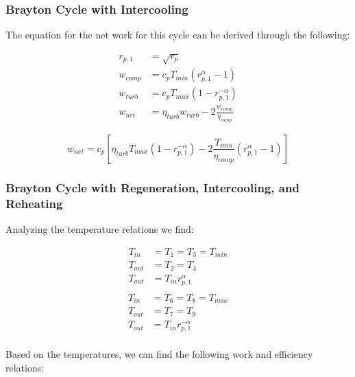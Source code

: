 \documentclass[
	12pt, %
]{brayton_cycle_report_style}
\begin{document}
\subsubsection{Brayton Cycle with Intercooling} 
The equation for the net work for this cycle can be derived through the following:

\begin{align*}
    r_{p,1} &= \sqrt{r_{p}} \\ 
    w_{comp} &= c_p T_{min}(r_{p,1}^\alpha-1) \\
    w_{turb} &= c_p T_{max}(1-r_{p,1}^{-\alpha}) \\
    w_{net} &= \eta_{turb} w_{turb}-2\frac{w_{comp}}{\eta_{comp}} 
\end{align*}

\begin{equation}
    w_{net} = c_p[\eta_{turb}T_{max}(1-r_{p,1}^{-\alpha})-2\frac{T_{min}}{\eta_{comp}}(r_{p,1}^\alpha-1)] 
    \label{eq:w_net_rir}
\end{equation}

\subsubsection{Brayton Cycle with Regeneration, Intercooling, and Reheating} 

Analyzing the temperature relations we find:

\vspace{-5mm}

\begin{multicols}{2}
  \begin{align*}
    T_{in} &= T_1=T_3=T_{min} \\
    T_{out} &= T_2=T_4 \\
    T_{out} &= T_{in}r_{p,1}^\alpha \\
  \end{align*}
  \vspace{1mm}
  \begin{align*}
    T_{in} &=T_6=T_8=T_{max} \\
    T_{out} &=T_7=T_9 \\
    T_{out} &= T_{in}r_{p,1}^{-\alpha} \\
  \end{align*}
\end{multicols}

\vspace{-10mm}

\noindent Based on the temperatures, we can find the following work and efficiency relations:
\end{document}
